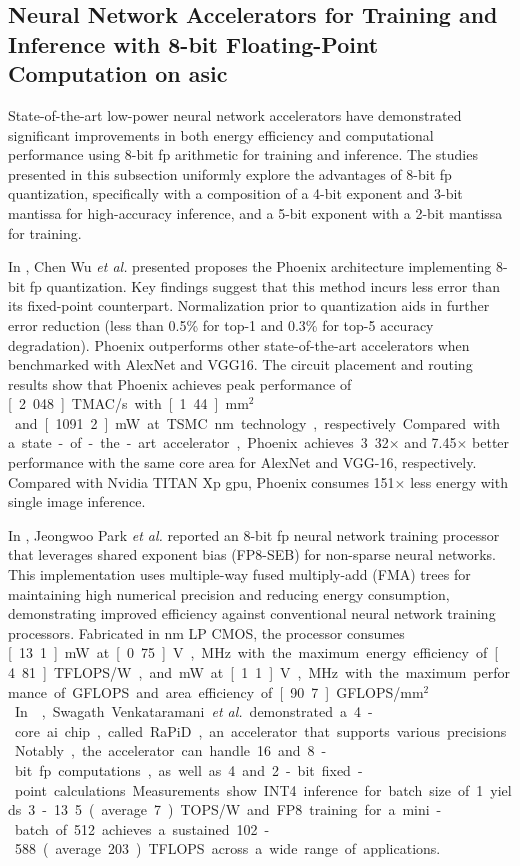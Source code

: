 \subsection{Neural Network Accelerators for Training and Inference with 8-bit Floating-Point Computation on \gls{asic}
}
State-of-the-art low-power neural network accelerators have demonstrated significant improvements in both energy efficiency and computational performance using 8-bit \gls{fp} arithmetic for training and inference. The studies presented in this subsection uniformly explore the advantages of 8-bit \gls{fp} quantization, specifically with a composition of a 4-bit exponent and 3-bit mantissa for high-accuracy inference, and a 5-bit exponent with a 2-bit mantissa for training.

In \cite{wu2020phoenix}, Chen Wu \textit{et al.} presented proposes the Phoenix architecture implementing 8-bit \gls{fp} quantization. Key findings suggest that this method incurs less error than its fixed-point counterpart. Normalization prior to quantization aids in further error reduction (less than 0.5\% for top-1 and 0.3\%
for top-5 accuracy degradation). Phoenix outperforms other state-of-the-art accelerators when benchmarked with AlexNet and VGG16. The circuit placement and routing results show that Phoenix achieves peak performance of \unit[2.048]{TMAC/s} with \unit[1.44]{mm$^2$} and \unit[1091.2]{mW} at TSMC \unit[28]{nm} technology, respectively. Compared with a state-of-the-art accelerator, Phoenix achieves 3.32$\times$ and 7.45$\times$ better performance with
the same core area for AlexNet and VGG-16, respectively.
Compared with Nvidia TITAN Xp \gls{gpu}, Phoenix consumes
151$\times$ less energy with single image inference.

In \cite{park2021neural}, Jeongwoo Park \textit{et al.} reported an 8-bit \gls{fp} neural network training processor that leverages shared exponent bias (FP8-SEB) for non-sparse neural networks. This implementation uses multiple-way fused multiply-add (FMA) trees for maintaining high numerical precision and reducing energy consumption, demonstrating improved efficiency against conventional neural network training processors. Fabricated in \unit[40]{nm} LP CMOS, the processor consumes
\unit[13.1]{mW} at \unit[0.75]{V}, \unit[20]{MHz} with the maximum energy efficiency of \unit[4.81]{TFLOPS/W}, and \unit[230]{mW} at \unit[1.1]{V}, \unit[180]{MHz} with the maximum performance of \unit[567]{GFLOPS} and area efficiency of \unit[90.7]{GFLOPS/mm$^2$}   .

In \cite{venkataramani2021rapid}, Swagath Venkataramani \textit{et al.} demonstrated a 4-core \gls{ai} chip, called RaPiD, an accelerator that supports various precisions. Notably, the accelerator can handle 16 and 8-bit \gls{fp} computations, as well as 4 and 2-bit fixed-point calculations. Measurements show INT4 inference for batch size of 1 yields 3 - 13.5 (average 7) TOPS/W and FP8 training for a mini-batch of 512 achieves a sustained 102 - 588 (average 203) TFLOPS across a wide range of applications.

